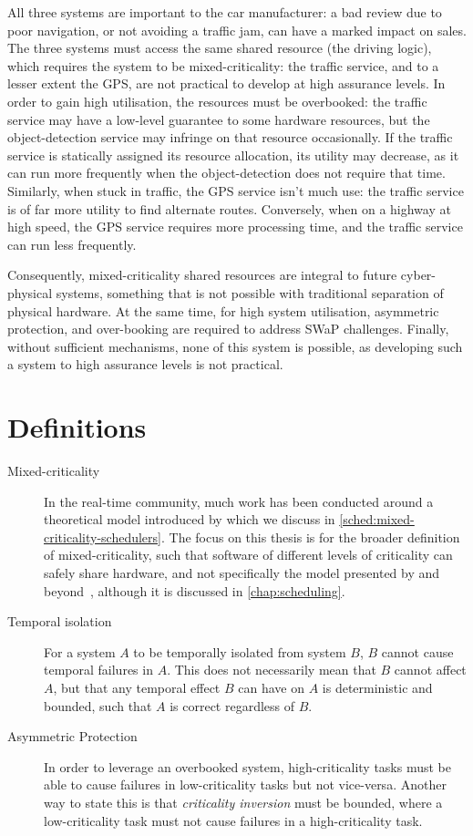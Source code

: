All three systems are important to the car manufacturer: a bad review due to poor navigation, or not
avoiding a traffic jam, can have a marked impact on sales. The three systems must access the same
shared resource (the driving logic), which requires the system to be mixed-criticality: the traffic
service, and to a lesser extent the GPS, are not practical to develop at high assurance levels. 
In order to gain high utilisation, the resources must be overbooked: the traffic service may have a
low-level guarantee to some hardware resources, but the object-detection service may infringe
on that resource occasionally. If the traffic service is statically assigned its resource
allocation, its utility may decrease, as it can run more frequently when the object-detection does not
require that time. Similarly, when stuck in traffic, the GPS service isn't much use: the traffic
service is of far more utility to find alternate routes. Conversely, when on a highway at high speed, the GPS
service requires more processing time, and the traffic service can run less frequently. 

Consequently, mixed-criticality shared resources are integral to future cyber-physical
systems, something that is not possible with traditional separation
of physical hardware. At the same time, for high system utilisation, 
asymmetric protection, and over-booking are required to address SWaP challenges. Finally, without
sufficient mechanisms, none of this system is possible, as developing such a system to high
assurance levels is not practical.

\section{Definitions}

\begin{description}
    \item[Mixed-criticality] In the real-time community, much work has been
conducted around a theoretical model introduced by \citet{Vestal_07} which we discuss in
\cref{sched:mixed-criticality-schedulers}.
The focus on this thesis is for the broader definition of mixed-criticality, such that software of
different levels of criticality can safely share hardware, and not specifically the model
presented by \citet{Vestal_07} and beyond~\citep{Burns_Davis_17}, although it is discussed in
\cref{chap:scheduling}.
\item[Temporal isolation] For a system $A$ to be temporally isolated from system $B$, $B$ cannot
        cause temporal failures in $A$. This does not necessarily mean that $B$ cannot affect $A$,
        but that any temporal effect $B$ can have on $A$ is deterministic and bounded, such that $A$
        is correct regardless of $B$. 
\item[Asymmetric Protection] In order to leverage an overbooked system, high-criticality tasks
        must be able to cause failures in low-criticality tasks but not vice-versa. Another way to
        state this is that \emph{criticality inversion} must be bounded, where a low-criticality
        task must not cause failures in a high-criticality task.
\end{description}


